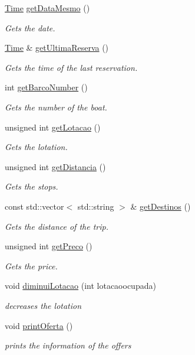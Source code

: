 \begin{DoxyCompactItemize}
\hyperlink{classTime}{Time} \hyperlink{classOferta_a13ebfcae88d39a90f0c66368534ed335}{get\+Data\+Mesmo} ()
\begin{DoxyCompactList}\small\item\em Gets the date. \end{DoxyCompactList}\item 
\hyperlink{classTime}{Time} \& \hyperlink{classOferta_a1caf2c681c14c9fbd04312b35f99b64c}{get\+Ultima\+Reserva} ()
\begin{DoxyCompactList}\small\item\em Gets the time of the last reservation. \end{DoxyCompactList}\item 
int \hyperlink{classOferta_abf0f062fa730edf6d4232926980b106c}{get\+Barco\+Number} ()
\begin{DoxyCompactList}\small\item\em Gets the number of the boat. \end{DoxyCompactList}\item 
unsigned int \hyperlink{classOferta_a9c8fbec401e54e590828209931bf25b0}{get\+Lotacao} ()
\begin{DoxyCompactList}\small\item\em Gets the lotation. \end{DoxyCompactList}\item 
unsigned int \hyperlink{classOferta_a0d07f80f25f4fb21c0819c3e25d67fb9}{get\+Distancia} ()
\begin{DoxyCompactList}\small\item\em Gets the stops. \end{DoxyCompactList}\item 
const std\+::vector$<$ std\+::string $>$ \& \hyperlink{classOferta_a746c91e5db19098d211a3f6bde2ec8ec}{get\+Destinos} ()
\begin{DoxyCompactList}\small\item\em Gets the distance of the trip. \end{DoxyCompactList}\item 
unsigned int \hyperlink{classOferta_a6237afc2e8a33fb55b1ef0decf9d9aaa}{get\+Preco} ()
\begin{DoxyCompactList}\small\item\em Gets the price. \end{DoxyCompactList}\item 
void \hyperlink{classOferta_a15e6c1e4f49243136eb5ca1d46925a77}{diminui\+Lotacao} (int lotacaoocupada)
\begin{DoxyCompactList}\small\item\em decreases the lotation \end{DoxyCompactList}\item 
void \hyperlink{classOferta_a745e9845f3d1a36e8a8712d576f303ba}{print\+Oferta} ()
\begin{DoxyCompactList}\small\item\em prints the information of the offers \end{DoxyCompactList}\end{DoxyCompactItemize}


